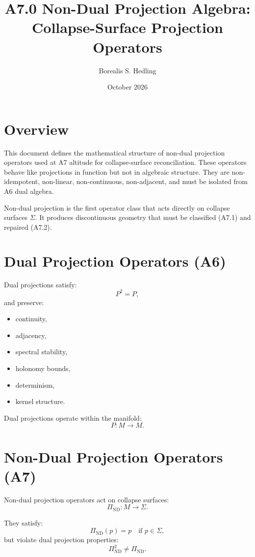 \documentclass[11pt]{article}
\title{A7.0 Non-Dual Projection Algebra: Collapse-Surface Projection Operators}
\author{Borealis S. Hedling}
\date{October 2026}
\begin{document}
\maketitle

\section*{Overview}

This document defines the mathematical structure of non-dual projection
operators used at A7 altitude for collapse-surface reconciliation. These
operators behave like projections in function but not in algebraic structure.
They are non-idempotent, non-linear, non-continuous, non-adjacent, and must
be isolated from A6 dual algebra.

Non-dual projection is the first operator class that acts directly on
collapse surfaces $\Sigma$. It produces discontinuous geometry that must be
classified (A7.1) and repaired (A7.2).

\section{Dual Projection Operators (A6)}

Dual projections satisfy:
\[
P^2 = P,
\]
and preserve:
\begin{itemize}
  \item continuity,
  \item adjacency,
  \item spectral stability,
  \item holonomy bounds,
  \item determinism,
  \item kernel structure.
\end{itemize}

Dual projections operate within the manifold:
\[
P : M \to M.
\]

\section{Non-Dual Projection Operators (A7)}

Non-dual projection operators act on collapse surfaces:
\[
\Pi_{\mathrm{ND}} : M \to \Sigma.
\]

They satisfy:
\[
\Pi_{\mathrm{ND}}(p) = p \quad \text{if } p \in \Sigma,
\]
but violate dual projection properties:
\[
\Pi_{\mathrm{ND}}^2 \ne \Pi_{\mathrm{ND}}.
\]
\end{document}
